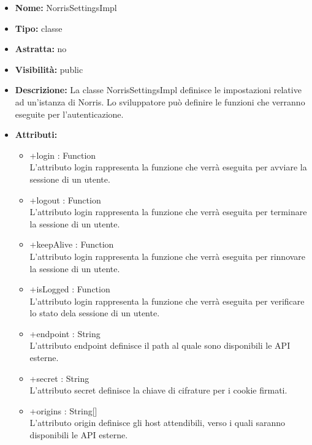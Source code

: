			
			\begin{itemize}
			\item \textbf{Nome:} NorrisSettingsImpl
			\item \textbf{Tipo:} classe
			
		\item \textbf{Astratta:}
		no
			\item \textbf{Visibilità:} public
			\item \textbf{Descrizione:} La classe NorrisSettingsImpl definisce le impostazioni relative ad un'istanza di Norris. Lo sviluppatore può definire le funzioni che verranno eseguite per l'autenticazione.
			\item \textbf{Attributi:}
				\begin{itemize}
				\setlength{\itemsep}{5pt}
				
					\item[\ding{111}] {+login : Function} \\ [1mm] L'attributo login rappresenta la funzione che verrà eseguita per avviare la sessione di un utente.
					\item[\ding{111}] {+logout : Function} \\ [1mm] L'attributo login rappresenta la funzione che verrà eseguita per terminare la sessione di un utente.
					\item[\ding{111}] {+keepAlive : Function} \\ [1mm] L'attributo login rappresenta la funzione che verrà eseguita per rinnovare la sessione di un utente.
					\item[\ding{111}] {+isLogged : Function} \\ [1mm] L'attributo login rappresenta la funzione che verrà eseguita per verificare lo stato dela sessione di un utente.
					\item[\ding{111}] {+endpoint : String} \\ [1mm] L'attributo endpoint definisce il path al quale sono disponibili le API esterne.
					\item[\ding{111}] {+secret : String} \\ [1mm] L'attributo secret definisce la chiave di cifrature per i cookie firmati.
					\item[\ding{111}] {+origins : String[]} \\ [1mm] L'attributo origin definisce gli host attendibili, verso i quali saranno disponibili le API esterne.
				\end{itemize}
		
			\end{itemize}
	
